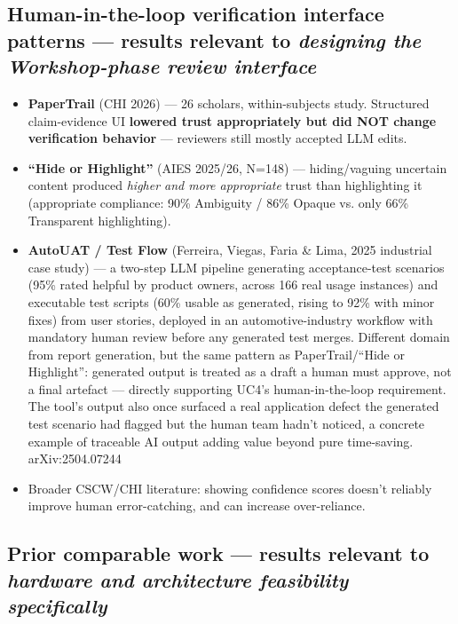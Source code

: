 \subsection{Human-in-the-loop verification interface patterns — results relevant to \textit{designing the Workshop-phase review interface}}\label{sec:res-hitl}

\begin{itemize}
\item \textbf{PaperTrail} (CHI 2026) — 26 scholars, within-subjects study. Structured claim-evidence UI \textbf{lowered trust appropriately but did NOT change verification behavior} — reviewers still mostly accepted LLM edits.
\item \textbf{\textquotedblleft{}Hide or Highlight\textquotedblright{}} (AIES 2025/26, N=148) — hiding/vaguing uncertain content produced \textit{higher and more appropriate} trust than highlighting it (appropriate compliance: 90\% Ambiguity / 86\% Opaque vs. only 66\% Transparent highlighting).
\item \textbf{AutoUAT / Test Flow} (Ferreira, Viegas, Faria \& Lima, 2025 industrial case study) — a two-step LLM pipeline generating acceptance-test scenarios (95\% rated helpful by product owners, across 166 real usage instances) and executable test scripts (60\% usable as generated, rising to 92\% with minor fixes) from user stories, deployed in an automotive-industry workflow with mandatory human review before any generated test merges. Different domain from report generation, but the same pattern as PaperTrail/\textquotedblleft{}Hide or Highlight\textquotedblright{}: generated output is treated as a draft a human must approve, not a final artefact — directly supporting UC4's human-in-the-loop requirement. The tool's output also once surfaced a real application defect the generated test scenario had flagged but the human team hadn't noticed, a concrete example of traceable AI output adding value beyond pure time-saving. arXiv:2504.07244
\item Broader CSCW/CHI literature: showing confidence scores doesn't reliably improve human error-catching, and can increase over-reliance.
\end{itemize}

\subsection{Prior comparable work — results relevant to \textit{hardware and architecture feasibility specifically}}\label{sec:res-prior}

